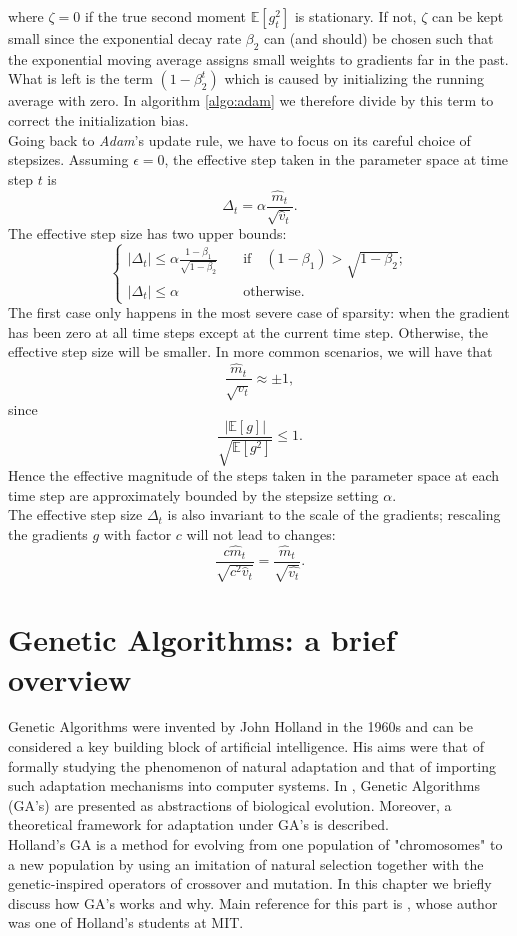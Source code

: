 \documentclass[%
    corpo=11pt,
    twoside,
    stile=classica,
    oldstyle,
    autoretitolo,
    tipotesi=magistrale,
    greek,
    evenboxes,
    english
]{toptesi}
\begin{document}
where $\zeta = 0$ if the true second moment $\mathbb{E}\left[g_t^2 \right]$ is stationary. If not, $\zeta$ can be kept small since the exponential decay rate $\beta_2$ can (and should) be chosen such that the exponential moving average assigns small weights to gradients far in the past. What is left is the term $(1 - \beta_2^t)$ which is caused by initializing the running average with zero. In algorithm \ref{algo:adam} we therefore divide by this term to correct the initialization bias. \\
Going back to \textit{Adam}'s update rule, we have to focus on its careful choice of stepsizes. Assuming $\epsilon = 0$, the effective step taken in the parameter space at time step $t$ is 
\begin{equation}
\Delta_t = \alpha\frac{\hat{m}_t}{\sqrt{\hat{v}_t}}.
\end{equation}
The effective step size has two upper bounds:
\begin{equation}
\begin{cases}
|\Delta_t| \leq \alpha\frac{1 - \beta_1}{\sqrt{1 - \beta_2}} \quad &\text{if} \quad (1-\beta_1) > \sqrt{1 - \beta_2}; \\
|\Delta_t| \leq \alpha \quad &\text{otherwise.}
\end{cases}
\end{equation}
The first case only happens in the most severe case of sparsity: when the gradient has been zero at all time steps except at the current time step. Otherwise, the effective step size will be smaller. In more common scenarios, we will have that 
$$\frac{\hat{m}_t}{\sqrt{v_t}} \approx \pm 1,$$
since 
$$\frac{|\mathbb{E}\left[g\right]|}{\sqrt{\mathbb{E}\left[g^2 \right]}}\leq 1.$$
Hence the effective magnitude of the steps taken in the parameter space at each time step are approximately bounded by the stepsize setting $\alpha$. \\
The effective step size $\Delta_t$ is also invariant to the scale of the gradients; rescaling the gradients $g$ with factor $c$ will not lead to changes:
\begin{equation}
\frac{c\hat{m}_t}{\sqrt{c^2\hat{v}_t}} = \frac{\hat{m}_t}{\sqrt{\hat{v_t}}}.
\end{equation}
\chapter{Genetic Algorithms: a brief overview}
Genetic Algorithms were invented by John Holland in the 1960s and can be considered a key building block of artificial intelligence. His aims were that of  formally studying the phenomenon of natural adaptation and that of importing such adaptation mechanisms into computer systems. In \cite{holland}, Genetic Algorithms (GA's) are presented as abstractions of biological evolution. Moreover, a theoretical framework for adaptation under GA's is described. \\
Holland's GA is a method for evolving from one population of "chromosomes" to a new population by using an imitation of natural selection together with the genetic-inspired operators of crossover and mutation. In this chapter we briefly discuss how GA's works and why. Main reference for this part is \cite{mit}, whose author was one of Holland's students at MIT.
\end{document}
